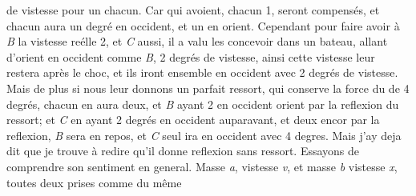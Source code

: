 %
%
de vistesse pour un chacun. Car
%
%
qui
%
%
avoient, chacun 1, seront compensés, et chacun aura un degré en occident, et un en orient. 
%
Cependant pour faire avoir à \textit{B} la vistesse reélle\protect{} 2, et \textit{C} aussi, il a valu les concevoir 
%
dans un bateau,\protect{} allant d'orient en occident comme \textit{B},
%
%
2 degrés de vistesse, ainsi cette vistesse leur restera après le choc, et ils iront ensemble en occident
%
 avec 2 degrés de vistesse. Mais de plus si nous leur donnons un parfait ressort,\protect{} qui conserve la force du
%
%
de 4 degrés, chacun en aura deux, et \textit{B} ayant 2
%
%
en occident
%
%
orient par la reflexion\protect{} du ressort;\protect{} et \textit{C} en ayant 2 degrés en occident 
%
auparavant, et deux encor par la reflexion,\protect{} \textit{B} sera en repos, et \textit{C} seul ira en occident 
%
avec 4 degres. Mais j'ay deja dit que je trouve à redire qu'il donne reflexion\protect{} sans ressort.\protect{} %
\pend
%
\pstart
%
Essayons de comprendre son sentiment en general. \pend
%
\pstart Masse \textit{a}, vistesse \textit{v}, et masse \textit{b} vistesse \textit{x}\lbrack,\rbrack\
%
toutes deux prises comme du même
%
